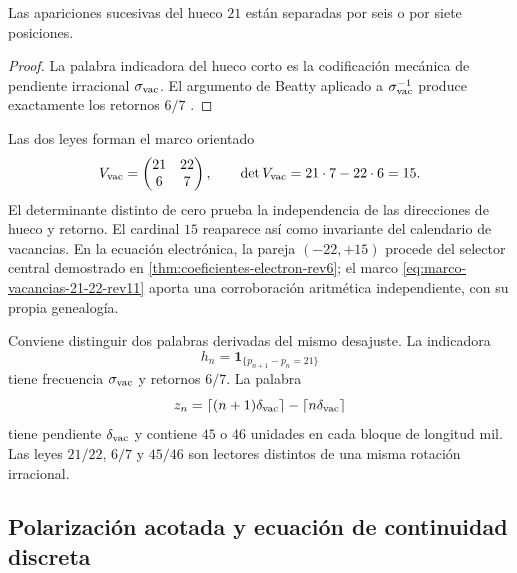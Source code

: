 \begin{corollary}
\label{cor:ley-retorno-vacancias-rev11}
Las apariciones sucesivas del hueco \(21\) están separadas por seis o por
siete posiciones.
\end{corollary}

\begin{proof}
La palabra indicadora del hueco corto es la codificación mecánica de
pendiente irracional \(\sigma_{\rm vac}\). El argumento de Beatty aplicado a
\(\sigma_{\rm vac}^{-1}\) produce exactamente los retornos \(6/7\)
\cite{Lothaire2002}.
\end{proof}

Las dos leyes forman el marco orientado
\begin{equation}
 V_{\rm vac}=
 \begin{pmatrix}21&22\\6&7\end{pmatrix},
 \qquad
 \det V_{\rm vac}=21\cdot7-22\cdot6=15.
 \label{eq:marco-vacancias-21-22-rev11}
\end{equation}
El determinante distinto de cero prueba la independencia de las direcciones
de hueco y retorno. El cardinal \(15\) reaparece así como invariante del
calendario de vacancias. En la ecuación electrónica, la pareja
\((-22,+15)\) procede del selector central demostrado en
\cref{thm:coeficientes-electron-rev6}; el marco
\eqref{eq:marco-vacancias-21-22-rev11} aporta una corroboración aritmética
independiente, con su propia genealogía.

Conviene distinguir dos palabras derivadas del mismo desajuste. La
indicadora
\[
 h_n=\mathbf 1_{\{p_{n+1}-p_n=21\}}
\]
tiene frecuencia \(\sigma_{\rm vac}\) y retornos \(6/7\). La palabra
\[
 z_n=\lceil(n+1)\delta_{\rm vac}\rceil
      -\lceil n\delta_{\rm vac}\rceil
\]
tiene pendiente \(\delta_{\rm vac}\) y contiene \(45\) o \(46\) unidades
en cada bloque de longitud mil. Las leyes \(21/22\), \(6/7\) y \(45/46\)
son lectores distintos de una misma rotación irracional.

\subsection{Polarización acotada y ecuación de continuidad discreta}

